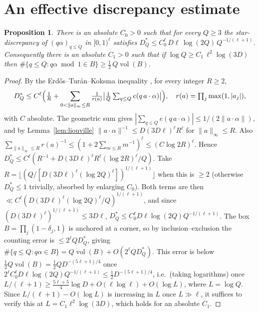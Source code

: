\documentclass[11pt]{article}
\newtheorem{proposition}{Proposition}
\theoremstyle{definition}
\newcommand{\norm}[1]{\lVert #1 \rVert}
\begin{document}
\section{An effective discrepancy estimate}\label{sec:disc}
\begin{proposition}\label{prop:disc}
There is an absolute $C_0>0$ such that for every $Q\ge3$ the star-discrepancy of $(q\alpha)_{q\le Q}$ in
$[0,1)^\ell$ satisfies $D_Q^\ast\le C_0^\ell\,D\ell\,\log(2Q)\,Q^{-1/(\ell+1)}$. Consequently there is an
absolute $C_1>0$ such that if $\log Q\ge C_1\,\ell^2\log(3D)$ then
$\#\{q\le Q:q\alpha\bmod1\in B\}\ge\tfrac12\,Q\operatorname{vol}(B)$.
\end{proposition}
\begin{proof}
By the Erd\H{o}s--Tur\'an--Koksma inequality \cite{DT}, for every integer $R\ge2$,
\[
  D_Q^\ast\le C^\ell\Bigl(\tfrac1R+\sum_{0<\norm a_\infty\le R}\tfrac1{r(a)}\bigl|\tfrac1Q\textstyle\sum_{q\le Q}e(q\,a\cdot\alpha)\bigr|\Bigr),\quad r(a)=\textstyle\prod_j\max(1,|a_j|),
\]
with $C$ absolute. The geometric sum gives $|\sum_{q\le Q}e(q\,a\cdot\alpha)|\le1/(2\norm{a\cdot\alpha})$, and
by Lemma~\ref{lem:liouville} $\norm{a\cdot\alpha}^{-1}\le D(3D\ell)^\ell R^\ell$ for $\norm a_\infty\le R$.
Also $\sum_{\norm a_\infty\le R}r(a)^{-1}\le(1+2\sum_{m\le R}m^{-1})^\ell\le(C\log2R)^\ell$. Hence
$D_Q^\ast\le C^\ell(R^{-1}+D(3D\ell)^\ell R^\ell(\log2R)^\ell/Q)$. Take
$R=\lfloor(Q/[D(3D\ell)^\ell(\log2Q)^\ell])^{1/(\ell+1)}\rfloor$ when this is $\ge2$ (otherwise
$D_Q^\ast\le1$ trivially, absorbed by enlarging $C_0$). Both terms are then
$\ll C^\ell(D(3D\ell)^\ell(\log2Q)^\ell/Q)^{1/(\ell+1)}$, and since
$(D(3D\ell)^\ell)^{1/(\ell+1)}\le3D\ell$, $D_Q^\ast\le C_0^\ell D\ell\log(2Q)Q^{-1/(\ell+1)}$. The box
$B=\prod_j(1-\delta_j,1)$ is anchored at a corner, so by inclusion--exclusion the counting error is
$\le2^\ell QD_Q^\ast$, giving $\#\{q\le Q:q\alpha\in B\}=Q\operatorname{vol}(B)+O(2^\ell QD_Q^\ast)$. This
error is below $\tfrac12Q\operatorname{vol}(B)=\tfrac12QD^{-(5\ell+1)/4}$ once
$2^\ell C_0^\ell D\ell\log(2Q)Q^{-1/(\ell+1)}\le\tfrac12D^{-(5\ell+1)/4}$, i.e.\ (taking logarithms) once
$L/(\ell+1)\ge\tfrac{5\ell+5}4\log D+O(\ell\log\ell)+O(\log L)$, where $L=\log Q$. Since
$L/(\ell+1)-O(\log L)$ is increasing in $L$ once $L\gg\ell$, it suffices to verify this at
$L=C_1\ell^2\log(3D)$, which holds for an absolute $C_1$.
\end{proof}
\end{document}
